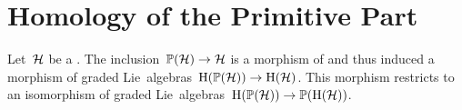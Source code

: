 \documentclass[a4paper,10pt,headings=standardclasses]{scrartcl}
\begin{document}
\section{Homology of the Primitive Part}

\begin{theorem}
  Let~$\mathcal{H}$ be a {\dgh}.
  The inclusion~$\mathbb{P}(\mathcal{H}) \to \mathcal{H}$ is a morphism of {\dgls} and thus induced a morphism of graded Lie~algebras~$\operatorname{H}(\mathbb{P}(\mathcal{H})) \to \operatorname{H}(\mathcal{H})$.
  This morphism restricts to an isomorphism of graded Lie~algebras~$\operatorname{H}(\mathbb{P}(\mathcal{H})) \to \mathbb{P}(\operatorname{H}(\mathcal{H}))$.
\end{theorem}






\appendix
















\printbibliography
\end{document}
